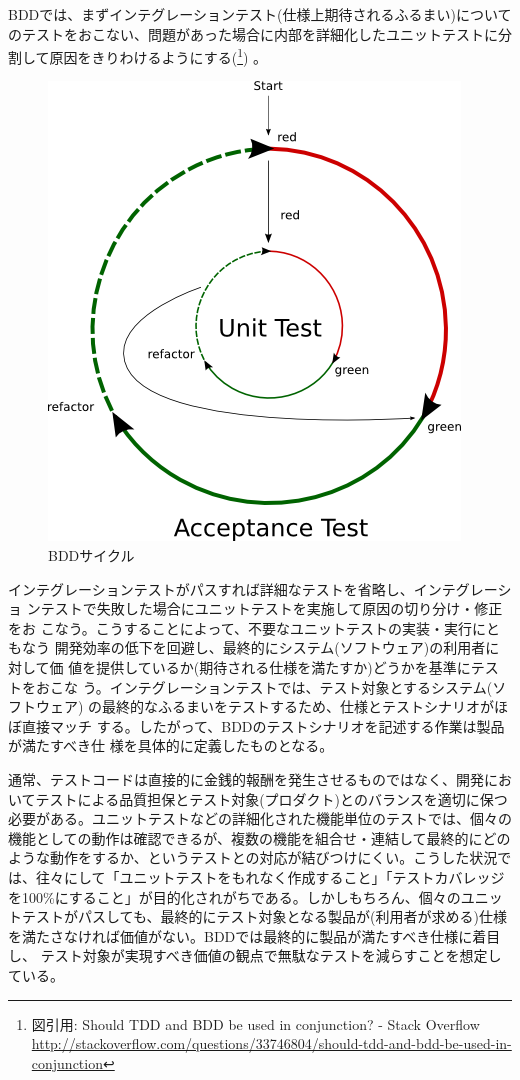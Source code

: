 BDDでは、まずインテグレーションテスト(仕様上期待されるふるまい)について
のテストをおこない、問題があった場合に内部を詳細化したユニットテストに分
割して原因をきりわけるようにする(\footnote{図引用:
Should TDD and BDD be used in conjunction? - Stack Overflow
\url{http://stackoverflow.com/questions/33746804/should-tdd-and-bdd-be-used-in-conjunction}})
。
\begin{figure}[h]
 \centering
 \includegraphics[scale=0.5]{img/bdd-cycle.png}
 \caption{BDDサイクル}
 \label{fig:bdd-cycle}
\end{figure}

インテグレーションテストがパスすれば詳細なテストを省略し、インテグレーショ
ンテストで失敗した場合にユニットテストを実施して原因の切り分け・修正をお
こなう。こうすることによって、不要なユニットテストの実装・実行にともなう
開発効率の低下を回避し、最終的にシステム(ソフトウェア)の利用者に対して価
値を提供しているか(期待される仕様を満たすか)どうかを基準にテストをおこな
う。インテグレーションテストでは、テスト対象とするシステム(ソフトウェア)
の最終的なふるまいをテストするため、仕様とテストシナリオがほぼ直接マッチ
する。したがって、BDDのテストシナリオを記述する作業は製品が満たすべき仕
様を具体的に定義したものとなる。

通常、テストコードは直接的に金銭的報酬を発生させるものではなく、開発にお
いてテストによる品質担保とテスト対象(プロダクト)とのバランスを適切に保つ
必要がある。ユニットテストなどの詳細化された機能単位のテストでは、個々の
機能としての動作は確認できるが、複数の機能を組合せ・連結して最終的にどの
ような動作をするか、というテストとの対応が結びつけにくい。こうした状況で
は、往々にして「ユニットテストをもれなく作成すること」「テストカバレッジ
を100\%にすること」が目的化されがちである。しかしもちろん、個々のユニッ
トテストがパスしても、最終的にテスト対象となる製品が(利用者が求める)仕様
を満たさなければ価値がない。BDDでは最終的に製品が満たすべき仕様に着目し、
テスト対象が実現すべき価値の観点で無駄なテストを減らすことを想定している。

